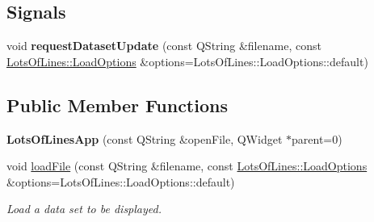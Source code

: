 \subsection*{Signals}
\begin{DoxyCompactItemize}
\item 
void {\bfseries request\+Dataset\+Update} (const Q\+String \&filename, const \hyperlink{struct_lots_of_lines_1_1_load_options}{Lots\+Of\+Lines\+::\+Load\+Options} \&options=Lots\+Of\+Lines\+::\+Load\+Options\+::default)\hypertarget{class_lots_of_lines_app_ac414bca34842822f3cab10f15ab8a526}{}\label{class_lots_of_lines_app_ac414bca34842822f3cab10f15ab8a526}

\end{DoxyCompactItemize}
\subsection*{Public Member Functions}
\begin{DoxyCompactItemize}
\item 
{\bfseries Lots\+Of\+Lines\+App} (const Q\+String \&open\+File, Q\+Widget $\ast$parent=0)\hypertarget{class_lots_of_lines_app_a741754c03fc7e8365a0e5db1389b4898}{}\label{class_lots_of_lines_app_a741754c03fc7e8365a0e5db1389b4898}

\item 
void \hyperlink{class_lots_of_lines_app_a1970960805f1670227d0c10bf74c8390}{load\+File} (const Q\+String \&filename, const \hyperlink{struct_lots_of_lines_1_1_load_options}{Lots\+Of\+Lines\+::\+Load\+Options} \&options=Lots\+Of\+Lines\+::\+Load\+Options\+::default)\hypertarget{class_lots_of_lines_app_a1970960805f1670227d0c10bf74c8390}{}\label{class_lots_of_lines_app_a1970960805f1670227d0c10bf74c8390}

\begin{DoxyCompactList}\small\item\em Load a data set to be displayed. \end{DoxyCompactList}\end{DoxyCompactItemize}
